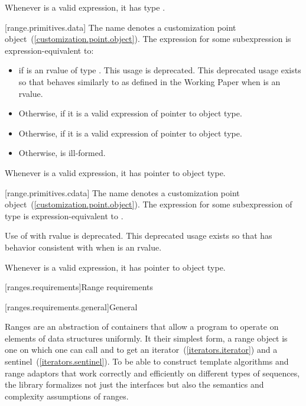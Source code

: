 \pnum
\enternote Whenever  is a valid expression, it
has type . \exitnote

[range.primitives.data]{}
\pnum
The name  denotes a customization point
object~(\ref{customization.point.object}). The expression
 for some subexpression  is
expression-equivalent to:

\begin{itemize}
\item
   if  is an rvalue of
  type . This usage is deprecated. \enternote
  This deprecated usage exists so that  behaves
  similarly to  as defined in the \Cpp Working
  Paper when  is an rvalue. \exitnote

\item
  Otherwise,  if it is a valid expression of pointer to object type.

\item
  Otherwise,  if it is a valid expression of pointer to object type.

\item
  Otherwise,  is ill-formed.
\end{itemize}

\pnum
\enternote Whenever  is a valid expression, it
has pointer to object type. \exitnote

[range.primitives.cdata]{}
\pnum
The name  denotes a customization point
object~(\ref{customization.point.object}). The expression
 for some subexpression  of type 
is expression-equivalent to .

\pnum
Use of  with rvalue  is deprecated.
\enternote This deprecated usage exists so that 
has behavior consistent with  when  is
an rvalue. \exitnote

\pnum
\enternote Whenever  is a valid expression, it
has pointer to object type. \exitnote

[ranges.requirements]{Range requirements}

[ranges.requirements.general]{General}

\pnum
Ranges are an abstraction of containers that allow a \Cpp program to
operate on elements of data structures uniformly. It their simplest form, a
range object is one on which one can call  and
 to get an iterator~(\ref{iterators.iterator}) and a
sentinel~(\ref{iterators.sentinel}). To be able to construct
template algorithms and range adaptors that work correctly and efficiently on
different types of sequences, the library formalizes not just the interfaces but
also the semantics and complexity assumptions of ranges.

